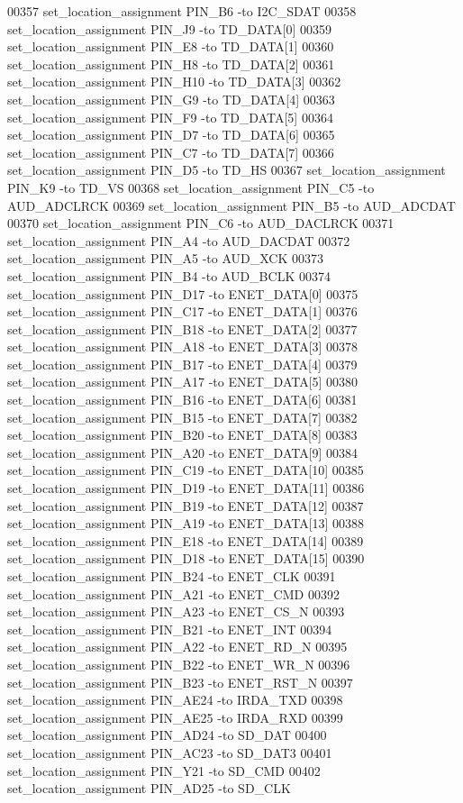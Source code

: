 \begin{DoxyCode}
00357 set\_location\_assignment PIN\_B6 -to I2C\_SDAT
00358 set\_location\_assignment PIN\_J9 -to TD\_DATA[0]
00359 set\_location\_assignment PIN\_E8 -to TD\_DATA[1]
00360 set\_location\_assignment PIN\_H8 -to TD\_DATA[2]
00361 set\_location\_assignment PIN\_H10 -to TD\_DATA[3]
00362 set\_location\_assignment PIN\_G9 -to TD\_DATA[4]
00363 set\_location\_assignment PIN\_F9 -to TD\_DATA[5]
00364 set\_location\_assignment PIN\_D7 -to TD\_DATA[6]
00365 set\_location\_assignment PIN\_C7 -to TD\_DATA[7]
00366 set\_location\_assignment PIN\_D5 -to TD\_HS
00367 set\_location\_assignment PIN\_K9 -to TD\_VS
00368 set\_location\_assignment PIN\_C5 -to AUD\_ADCLRCK
00369 set\_location\_assignment PIN\_B5 -to AUD\_ADCDAT
00370 set\_location\_assignment PIN\_C6 -to AUD\_DACLRCK
00371 set\_location\_assignment PIN\_A4 -to AUD\_DACDAT
00372 set\_location\_assignment PIN\_A5 -to AUD\_XCK
00373 set\_location\_assignment PIN\_B4 -to AUD\_BCLK
00374 set\_location\_assignment PIN\_D17 -to ENET\_DATA[0]
00375 set\_location\_assignment PIN\_C17 -to ENET\_DATA[1]
00376 set\_location\_assignment PIN\_B18 -to ENET\_DATA[2]
00377 set\_location\_assignment PIN\_A18 -to ENET\_DATA[3]
00378 set\_location\_assignment PIN\_B17 -to ENET\_DATA[4]
00379 set\_location\_assignment PIN\_A17 -to ENET\_DATA[5]
00380 set\_location\_assignment PIN\_B16 -to ENET\_DATA[6]
00381 set\_location\_assignment PIN\_B15 -to ENET\_DATA[7]
00382 set\_location\_assignment PIN\_B20 -to ENET\_DATA[8]
00383 set\_location\_assignment PIN\_A20 -to ENET\_DATA[9]
00384 set\_location\_assignment PIN\_C19 -to ENET\_DATA[10]
00385 set\_location\_assignment PIN\_D19 -to ENET\_DATA[11]
00386 set\_location\_assignment PIN\_B19 -to ENET\_DATA[12]
00387 set\_location\_assignment PIN\_A19 -to ENET\_DATA[13]
00388 set\_location\_assignment PIN\_E18 -to ENET\_DATA[14]
00389 set\_location\_assignment PIN\_D18 -to ENET\_DATA[15]
00390 set\_location\_assignment PIN\_B24 -to ENET\_CLK
00391 set\_location\_assignment PIN\_A21 -to ENET\_CMD
00392 set\_location\_assignment PIN\_A23 -to ENET\_CS\_N
00393 set\_location\_assignment PIN\_B21 -to ENET\_INT
00394 set\_location\_assignment PIN\_A22 -to ENET\_RD\_N
00395 set\_location\_assignment PIN\_B22 -to ENET\_WR\_N
00396 set\_location\_assignment PIN\_B23 -to ENET\_RST\_N
00397 set\_location\_assignment PIN\_AE24 -to IRDA\_TXD
00398 set\_location\_assignment PIN\_AE25 -to IRDA\_RXD
00399 set\_location\_assignment PIN\_AD24 -to SD\_DAT
00400 set\_location\_assignment PIN\_AC23 -to SD\_DAT3
00401 set\_location\_assignment PIN\_Y21 -to SD\_CMD
00402 set\_location\_assignment PIN\_AD25 -to SD\_CLK

\end{DoxyCode}
